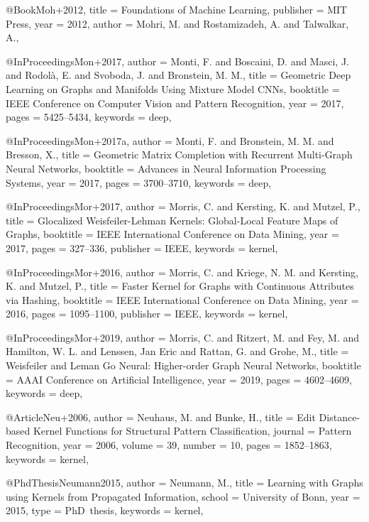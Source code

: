 @Book{Moh+2012,
  title     = {Foundations of Machine Learning},
  publisher = {MIT Press},
  year      = {2012},
  author    = {Mohri, M. and Rostamizadeh, A. and Talwalkar, A.},
}

@InProceedings{Mon+2017,
  author    = {Monti, F. and Boscaini, D. and Masci, J. and Rodol{\`{a}}, E. and Svoboda, J. and Bronstein, M. M.},
  title     = {Geometric Deep Learning on Graphs and Manifolds Using Mixture Model {CNNs}},
  booktitle = {IEEE Conference on Computer Vision and Pattern Recognition},
  year      = {2017},
  pages     = {5425--5434},
  keywords  = {deep},
}

@InProceedings{Mon+2017a,
  author    = {Monti, F. and Bronstein, M. M. and Bresson, X.},
  title     = {Geometric Matrix Completion with Recurrent Multi-Graph Neural Networks},
  booktitle = {Advances in Neural Information Processing Systems},
  year      = {2017},
  pages     = {3700--3710},
  keywords  = {deep},
}

@InProceedings{Mor+2017,
  author    = {Morris, C. and Kersting, K. and Mutzel, P.},
  title     = {Glocalized {W}eisfeiler-{L}ehman Kernels: Global-Local Feature Maps of Graphs},
  booktitle = {IEEE International Conference on Data Mining},
  year      = {2017},
  pages     = {327--336},
  publisher = {IEEE},
  keywords  = {kernel},
}

@InProceedings{Mor+2016,
  author    = {Morris, C. and Kriege, N. M. and Kersting, K. and Mutzel, P.},
  title     = {Faster Kernel for Graphs with Continuous Attributes via Hashing},
  booktitle = {IEEE International Conference on Data Mining},
  year      = {2016},
  pages     = {1095--1100},
  publisher = {IEEE},
  keywords  = {kernel},
}

@InProceedings{Mor+2019,
  author    = {Morris, C. and Ritzert, M. and Fey, M. and Hamilton, W. L. and Lenssen, Jan Eric and Rattan, G. and Grohe, M.},
  title     = {{Weisfeiler and Leman} Go Neural: {H}igher-order Graph Neural Networks},
  booktitle = {AAAI Conference on Artificial Intelligence},
  year      = {2019},
  pages     = {4602--4609},
  keywords  = {deep},
}

@Article{Neu+2006,
  author   = {Neuhaus, M. and Bunke, H.},
  title    = {Edit Distance-based Kernel Functions for Structural Pattern Classification},
  journal  = {Pattern Recognition},
  year     = {2006},
  volume   = {39},
  number   = {10},
  pages    = {1852--1863},
  keywords = {kernel},
}

@PhdThesis{Neumann2015,
  author   = {Neumann, M.},
  title    = {Learning with Graphs using Kernels from Propagated Information},
  school   = {University of Bonn},
  year     = {2015},
  type     = {PhD~thesis},
  keywords = {kernel},
}

